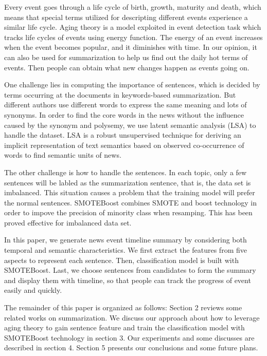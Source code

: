 \documentclass{llncs}
\begin{document}
Every event goes through a life cycle of birth, growth, maturity and death, which means that special terms utilized for descripting different events experience a similar life cycle. Aging theory \cite{2003-Chen-p47-59} is a model exploited in event detection task which tracks life cycles of events using energy function. The energy of an event increases when the event becomes popular, and it diminishes with time. In our opinion, it can also be used for summarization to help us find out the daily hot terms of events. Then people can obtain what new changes happen as events going on.

One challenge lies in computing the importance of sentences, which is decided by terms occurring at the documents in keywords-based summarization. But different authors use different words to express the same meaning and lots of synonyms. In order to find the core words in the news without the influence caused by the synonym and polysemy, we use latent semantic analysis (LSA) \cite{1990-Deerwester-p391-407} to handle the dataset. LSA is a robust unsupervised technique for deriving an implicit representation of text semantics based on observed co-occurrence of words to find semantic units of news.

The other challenge is how to handle the sentences. In each topic, only a few sentences will be labled as the summarization sentence, that is, the data set is imbalanced. This situation causes a problem that the training model will prefer the normal sentences. SMOTEBoost \cite{chawla2003smoteboost} combines SMOTE \cite{chawla2011smote} and boost technology in order to impove the precision of minority class when resamping. This has been proved effective for imbalanced data set. 

In this paper, we generate news event timeline summary by considering both temporal and semantic characteristics. We first extract the features from five aspects to represent each sentence. Then, classification model is built with SMOTEBoost. Last, we choose sentences from candidates to form the summary and display them with timeline, so that people can track the progress of event easily and quickly.

The remainder of this paper is organized as follows: Section 2 reviews some related works on summarization. We discuss our approach about how to leverage aging theory to gain sentence feature and train the classification model with SMOTEBoost technology in section 3. Our experiments and some discusses are described in section 4. Section 5 presents our conclusions and some future plans.
\end{document}
